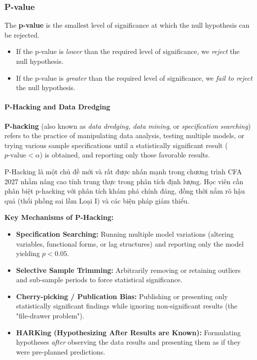\subsubsection{P-value} %
\label{ssub:P-value}
The \textbf{p-value} is the smallest level of significance at which the null hypothesis can be rejected.
\begin{itemize}
	\item[-] If the p-value is \textit{lower} than the required level of significance, we \textit{reject} the null hypothesis.
	\item[-] If the p-value is \textit{greater} than the required level of significance, we \textit{fail to reject} the null hypothesis.
\end{itemize}

\paragraph{P-Hacking and Data Dredging}
\textbf{P-hacking} (also known as \textit{data dredging, data mining}, or \textit{specification searching}) refers to the practice of manipulating data analysis, testing multiple models, or trying various sample specifications until a statistically significant result ($p\text{-value} < \alpha$) is obtained, and reporting only those favorable results.

\begin{tcolorbox}[colback=red!5!white,colframe=red!75!black,title=\textbf{Cập nhật chương trình 2027}]
P-Hacking là một chủ đề mới và rất được nhấn mạnh trong chương trình CFA 2027 nhằm nâng cao tính trung thực trong phân tích định lượng. Học viên cần phân biệt p-hacking với phân tích khám phá chính đáng, đồng thời nắm rõ hậu quả (thổi phồng sai lầm Loại I) và các biện pháp giảm thiểu.
\end{tcolorbox}

\textbf{Key Mechanisms of P-Hacking:}
\begin{itemize}
	\item \textbf{Specification Searching:} Running multiple model variations (altering variables, functional forms, or lag structures) and reporting only the model yielding $p < 0.05$.
	\item \textbf{Selective Sample Trimming:} Arbitrarily removing or retaining outliers and sub-sample periods to force statistical significance.
	\item \textbf{Cherry-picking / Publication Bias:} Publishing or presenting only statistically significant findings while ignoring non-significant results (the "file-drawer problem").
	\item \textbf{HARKing (Hypothesizing After Results are Known):} Formulating hypotheses \textit{after} observing the data results and presenting them as if they were pre-planned predictions.
\end{itemize}

